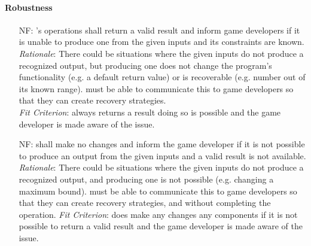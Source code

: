 \paragraph{Robustness}
\noindent \begin{itemize}[wide=0pt, leftmargin=*]

    \item[NF\refstepcounter{nfnum}\thenfnum \label{N_RecoverNeutral}:]
    \progname{}'s operations shall return a valid result and inform game
    developers if it is unable to produce one from the given inputs and its
    constraints are known. \vspace*{1mm}\\
    \textit{Rationale}: There could be situations where the given inputs do not
    produce a recognized output, but producing one does not change the
    program's functionality (e.g. a default return value) or is recoverable
    (e.g. number out of its known range). \progname{} must be able to
    communicate this to game developers so that they can create recovery
    strategies. \vspace*{1mm}\\
    \textit{Fit Criterion}: \progname{} always returns a result doing so is
    possible and the game developer is made aware of the issue.

    \item[NF\refstepcounter{nfnum}\thenfnum \label{N_RecoverNoChange}:]
    \progname{} shall make no changes and inform the game developer if it is
    not possible to produce an output from the given inputs and a valid result
    is not available. \vspace*{1mm}\\
    \textit{Rationale}: There could be situations where the given inputs do not
    produce a recognized output, and producing one is not possible (e.g.
    changing a maximum bound). \progname{} must be able to
    communicate this to game developers so that they can create recovery
    strategies, and without completing the operation. \vspace*{1mm}\linebreak
    \textit{Fit Criterion}: \progname{} does make any changes any components if
    it is not possible to return a valid result and the game developer is made
    aware of the issue.

\end{itemize}

